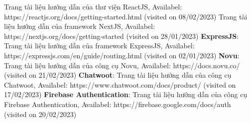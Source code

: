 \documentclass[../DoAn.tex]{subfiles}
\begin{document}
\cite{ReactJS} Trang tài liệu hướng dẫn của thư viện ReactJS, Availabel: https://reactjs.org/docs/getting-started.html (visited on 08/02/2023)
\cite{NextJS} Trang tài liệu hướng dẫn của framework NextJS, Availabel: https://nextjs.org/docs/getting-started (visited on 28/01/2023)
\textbf{ExpressJS}: Trang tài liệu hướng dẫn của framework ExpressJS, Availabel: https://expressjs.com/en/guide/routing.html (visited on 02/01/2023)
\textbf{Novu}: Trang tài liệu hướng dẫn của công cụ Novu, Availabel: https://docs.novu.co/ (visited on 21/02/2023)
\textbf{Chatwoot}: Trang tài liệu hướng dẫn của công cụ Chatwoot, Availabel: https://www.chatwoot.com/docs/product/ (visited on 17/02/2023)
\textbf{Firebase Authentication}: Trang tài liệu hướng dẫn của công cụ Firebase Authentication, Availabel: https://firebase.google.com/docs/auth (visited on 20/02/2023)
\end{document}
